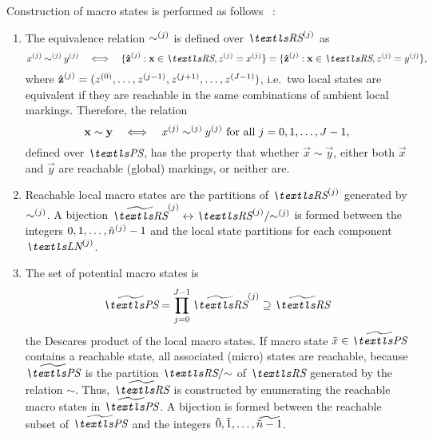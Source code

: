 Construction of macro states is performed as follows%
~\citep{DBLP:journals/tse/Buchholz99}:
\begin{enumerate}
\item The equivalence relation $\sim^{(j)}$ is defined over
  $\loc{\RS}{j}$ as
  \begin{equation}
    \label{eq:genstor:explicit:block:locsim}
    \loc{x}{j} \mathbin{\loc{\sim}{j}} \loc{y}{j}
    \quad\Longleftrightarrow\quad \{ \loc{\hat{\vec{z}}}{j} : \vec{x}
    \in \RS, \loc{z}{j} =
    \loc{x}{j} \} = \{ \loc{\hat{\vec{z}}}{j} : \vec{x} \in \RS, \loc{z}{j} = \loc{y}{j} \}
    \text,
  \end{equation}
  where
  $\hat{\bm{\mathrm{z}}}^{(j)} = (z^{(0)}, \ldots, z^{(j - 1)},
  z^{(j + 1)}, \ldots, z^{(J - 1)})$,
  i.e.~two local states are equivalent if they are reachable in the
  same combinations of ambient local markings. Therefore, the relation
  \begin{equation}
    \bm{\mathrm{x}} \sim \bm{\mathrm{y}} \quad\Longleftrightarrow\quad x^{(j)}
    \mathbin{\sim^{(j)}} y^{(j)} \text{ for all $j = 0, 1,
      \ldots, J - 1$,}
  \end{equation}
  defined over $\PS$, has the property that whether
  $\vec{x} \sim \vec{y}$, either both $\vec{x}$ and $\vec{y}$ are
  reachable (global) markings, or neither are.
\item Reachable local macro states are the partitions of
  $\loc{\RS}{j}$ generated by $\sim^{(j)}$. A bijection
  $\loc{\Macro{\RS}}{j} \leftrightarrow \loc{\RS}{j} / {\loc{\sim}{j}}$
  is formed between the integers
  $0, 1, \ldots, \tilde{n}^{(j)} - 1$ and the local state
  partitions for each component $\LN{j}$.
\item The set of potential macro states is
  \begin{equation}
    \Macro{\PS} = \prod_{j = 0}^{J - 1} \loc{\Macro{\RS}}{j}
    \supseteq \Macro{\RS}
  \end{equation}
  the Descares product of the local macro states. If macro state
  $\macro{x} \in \Macro{\PS}$ contains a reachable state, all
  associated (micro) states are reachable, because $\Macro{\PS}$ is
  the partition $\RS / {\sim}$ of $\RS$ generated by the relation
  $\sim$. Thus, $\Macro{\RS}$ is constructed by enumerating the
  reachable macro states in $\Macro{\PS}$. A bijection is formed
  between the reachable subset of $\Macro{\PS}$ and the integers
  $\tilde{0}, \tilde{1}, \ldots, \widetilde{\tilde{n} - 1}$.
\end{enumerate}

